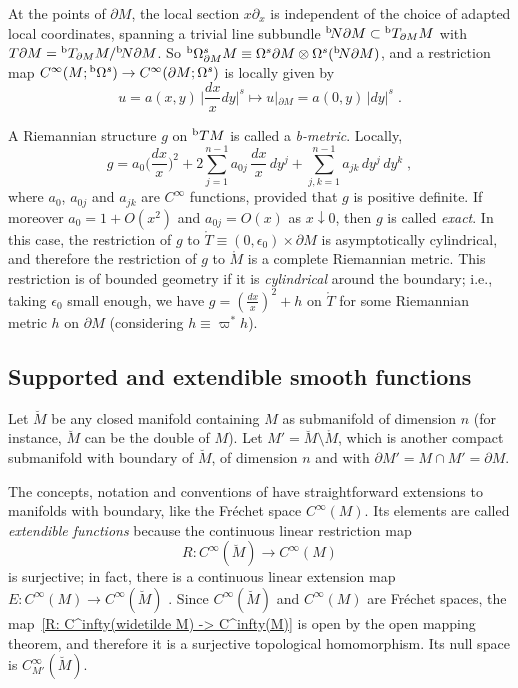 \documentclass{memo-l}
\theoremstyle{plain}
\theoremstyle{definition}
\theoremstyle{remark}
\newcommand{\bOmega}{{}^{\text{\rm b}}\Omega}
\newcommand{\bT}{{}^{\text{\rm b}}T}
\numberwithin{section}{chapter}
\numberwithin{equation}{section}%
\begin{document}
At the points of $\partial M$, the local section $x\partial_x$ is independent of the choice of adapted local coordinates, spanning a trivial line subbundle ${}^{\text{\rm b}}\!N\partial M\subset\bT_{\partial M}M$ with $T\partial M=\bT_{\partial M}M/{}^{\text{\rm b}}\!N\partial M$. So $\bOmega^s_{\partial M}M\equiv\Omega^s\partial M\otimes\Omega^s({}^{\text{\rm b}}\!N\partial M)$, and a restriction map $C^\infty(M;\bOmega^s)\to C^\infty(\partial M;\Omega^s)$ is locally given by
\[
u=a(x,y)\,\Big|\frac{dx}{x}dy\Big|^s\mapsto u|_{\partial M}=a(0,y)\,|dy|^s\;.
\]

A Riemannian structure $g$ on $\bT M$ is called a \emph{b-metric}.  Locally,
\[
g=a_0\Big(\frac{dx}{x}\Big)^2+2\sum_{j=1}^{n-1}a_{0j}\,\frac{dx}{x}\,dy^j
+\sum_{j,k=1}^{n-1}a_{jk}\,dy^j\,dy^k\;,
\]
where $a_0$, $a_{0j}$ and $a_{jk}$ are $C^\infty$ functions, provided that $g$ is positive definite. If moreover $a_0=1+O(x^2)$ and $a_{0j}=O(x)$ as $x\downarrow0$, then $g$ is called \emph{exact}. In this case, the restriction of $g$ to $\mathring T\equiv(0,\epsilon_0)\times\partial M$ is asymptotically cylindrical, and therefore the restriction of $g$ to $\mathring M$ is a complete Riemannian metric. This restriction is of bounded geometry if it is \emph{cylindrical} around the boundary; i.e., taking $\epsilon_0$ small enough, we have $g=(\frac{dx}{x})^2+h$ on $\mathring T$ for some Riemannian metric $h$ on $\partial M$ (considering $h\equiv\varpi^*h$).


\subsection{Supported and extendible smooth functions}\label{ss: supported and extendible smooth funcs}

Let $\breve M$  be any closed manifold containing $M$ as submanifold of dimension $n$ (for instance, $\breve M$ can be the double of $M$). Let $M'=\breve M\setminus\mathring M$, which is another compact submanifold with boundary of $\breve M$, of dimension $n$ and with $\partial M'=M\cap M'=\partial M$. 

The concepts, notation and conventions of  have straightforward extensions to manifolds with boundary, like the Fr\'echet space $C^\infty(M)$. Its elements are called \emph{extendible functions}  because the continuous linear restriction map
\begin{equation}\label{R: C^infty(widetilde M) -> C^infty(M)}
R:C^\infty(\breve M)\to C^\infty(M)
\end{equation}
is surjective; in fact, there is a continuous linear extension map $E:C^\infty(M)\to C^\infty(\breve M)$ \cite{Seeley1964}. Since $C^\infty(\breve M)$ and $C^\infty(M)$ are Fr\'echet spaces, the map~\eqref{R: C^infty(widetilde M) -> C^infty(M)} is open by the open mapping theorem, and therefore it is a surjective topological homomorphism. Its null space is $C^\infty_{M'}(\breve M)$.
\end{document}
